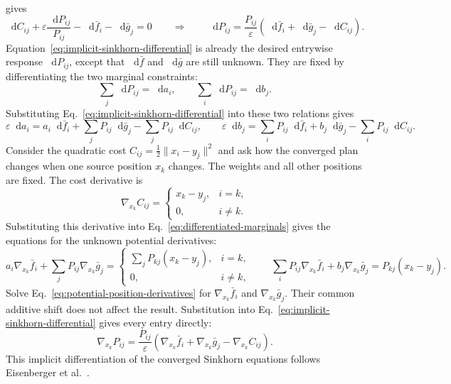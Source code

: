 \documentclass[11pt]{article}
\newcommand{\dd}{\mathop{}\!\mathrm{d}}
\begin{document}
gives
\begin{equation}
  \dd C_{ij}
  +\varepsilon\frac{\dd P_{ij}}{P_{ij}}
  -\dd\bar f_i-\dd\bar g_j=0
  \qquad\Longrightarrow\qquad
  \dd P_{ij}
  =\frac{P_{ij}}{\varepsilon}
    (\dd\bar f_i+\dd\bar g_j-\dd C_{ij}).
  \label{eq:implicit-sinkhorn-differential}
\end{equation}
Equation~\eqref{eq:implicit-sinkhorn-differential} is already the desired
entrywise response $\dd P_{ij}$, except that $\dd\bar f$ and $\dd\bar g$ are
still unknown. They are fixed by differentiating the two marginal
constraints:
\begin{equation}
  \sum_j\dd P_{ij}=\dd a_i,
  \qquad
  \sum_i\dd P_{ij}=\dd b_j.
  \label{eq:differentiated-marginal-constraints}
\end{equation}
Substituting Eq.~\eqref{eq:implicit-sinkhorn-differential} into these two
relations gives
\begin{equation}
  \varepsilon\dd a_i
  =a_i\dd\bar f_i+\sum_jP_{ij}\dd\bar g_j
   -\sum_jP_{ij}\dd C_{ij},
  \qquad
  \varepsilon\dd b_j
  =\sum_iP_{ij}\dd\bar f_i+b_j\dd\bar g_j
   -\sum_iP_{ij}\dd C_{ij}.
  \label{eq:differentiated-marginals}
\end{equation}
Consider the quadratic cost
$C_{ij}=\frac12\lVert x_i-y_j\rVert^2$ and ask how the converged plan changes
when one source position $x_k$ changes. The weights and all other positions
are fixed. The cost derivative is
\begin{equation}
  \nabla_{x_k}C_{ij}
  =
  \begin{cases}
    x_k-y_j,&i=k,\\
    0,&i\ne k.
  \end{cases}
  \label{eq:cost-position-derivative}
\end{equation}
Substituting this derivative into Eq.~\eqref{eq:differentiated-marginals}
gives the equations for the unknown potential derivatives:
\begin{equation}
  a_i\nabla_{x_k}\bar f_i
  +\sum_jP_{ij}\nabla_{x_k}\bar g_j
  =
  \begin{cases}
    \displaystyle\sum_jP_{kj}(x_k-y_j),&i=k,\\
    0,&i\ne k,
  \end{cases}
  \qquad
  \sum_iP_{ij}\nabla_{x_k}\bar f_i
  +b_j\nabla_{x_k}\bar g_j
  =P_{kj}(x_k-y_j).
  \label{eq:potential-position-derivatives}
\end{equation}
Solve Eq.~\eqref{eq:potential-position-derivatives} for
$\nabla_{x_k}\bar f_i$ and $\nabla_{x_k}\bar g_j$. Their common additive
shift does not affect the result. Substitution into
Eq.~\eqref{eq:implicit-sinkhorn-differential} gives every entry directly:
\begin{equation}
  \nabla_{x_k}P_{ij}
  =\frac{P_{ij}}{\varepsilon}
  \left(
    \nabla_{x_k}\bar f_i+
    \nabla_{x_k}\bar g_j-
    \nabla_{x_k}C_{ij}
  \right).
  \label{eq:coupling-position-derivative}
\end{equation}
This implicit differentiation of the converged Sinkhorn equations follows
Eisenberger et al.~\cite{eisenberger-2022}.
\end{document}
